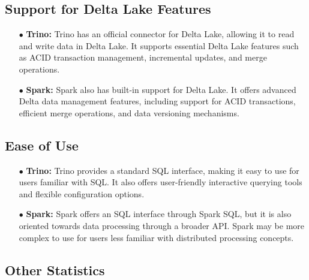 \subsection{Support for Delta Lake Features}
\begin{enumerate}
\item[$\bullet$] \textbf{Trino:} Trino has an official connector for Delta Lake, allowing it to read and write data in Delta Lake. It supports essential Delta Lake features such as ACID transaction management, incremental updates, and merge operations.
\item[$\bullet$] \textbf{Spark:} Spark also has built-in support for Delta Lake. It offers advanced Delta data management features, including support for ACID transactions, efficient merge operations, and data versioning mechanisms.
\end{enumerate}

\subsection{Ease of Use}
\begin{enumerate}
\item[$\bullet$] \textbf{Trino:} Trino provides a standard SQL interface, making it easy to use for users familiar with SQL. It also offers user-friendly interactive querying tools and flexible configuration options.
\item[$\bullet$] \textbf{Spark:} Spark offers an SQL interface through Spark SQL, but it is also oriented towards data processing through a broader API. Spark may be more complex to use for users less familiar with distributed processing concepts.
\end{enumerate}

\subsection{Other Statistics}

